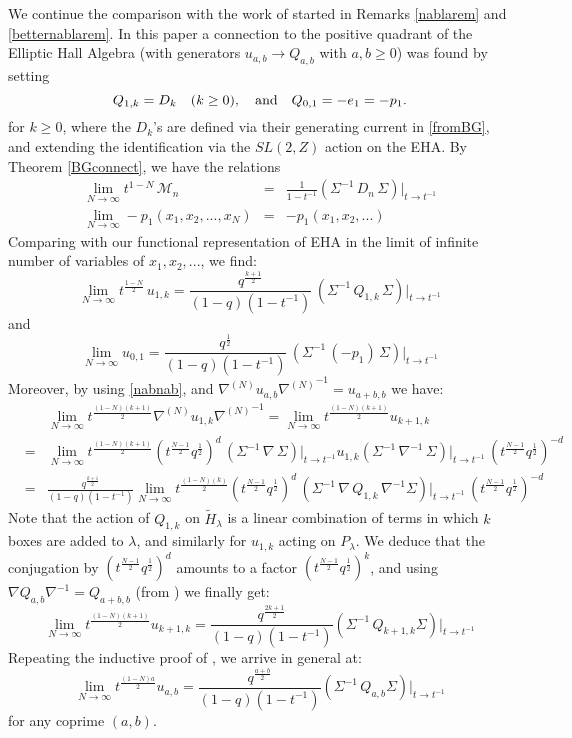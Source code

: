 \begin{remark}
We continue the comparison with the work of \cite{BGLX} started in Remarks \ref{nablarem} and
\ref{betternablarem}. In this paper a connection to the positive quadrant of the Elliptic Hall Algebra
(with generators $u_{a,b}\to Q_{a,b}$ with $a,b\geq 0$) was found by setting
$$Q_{1,k}= D_k \quad (k\geq 0), \quad {\rm and} \quad Q_{0,1}=-e_1=-p_1 .$$
for $k\geq 0$,
where the $D_k$'s are defined via their generating current in \eqref{fromBG}, and extending the identification
via the $SL(2,Z)$ action on the EHA. 
By Theorem \ref{BGconnect}, we have the relations
\begin{eqnarray*}
\lim_{N\to \infty} t^{1-N}\, {\mathcal M}_{n}&=& \frac{1}{1-t^{-1}}(\Sigma^{-1}\, D_n\, \Sigma)\vert_{t\to t^{-1}} \\
\lim_{N\to \infty} -p_1(x_1,x_2,...,x_N) &=&-p_1(x_1,x_2,...)
\end{eqnarray*}
Comparing with our functional representation of EHA in the limit of infinite number of variables of $x_1,x_2,...$, we find:
$$ \lim_{N\to \infty} t^{\frac{1-N}{2}}\, u_{1,k}=
\frac{q^{\frac{k+1}{2}}}{(1-q)(1-t^{-1})}\,(\Sigma^{-1}\, Q_{1,k}\, \Sigma)\vert_{t\to t^{-1}}$$
and
$$\lim_{N\to \infty} u_{0,1}=\frac{q^{\frac{1}{2}}}{(1-q)(1-t^{-1})}\, (\Sigma^{-1}\, (-p_1)\, \Sigma)\vert_{t\to t^{-1}}$$
Moreover, by using \eqref{nabnab}, and $\nabla^{(N)}u_{a,b}{\nabla^{(N)}}^{-1}=u_{a+b,b}$ we have:
\begin{eqnarray*}
&&\!\!\!\!\!\!\!\!\!\!\!\! \lim_{N\to \infty} t^{\frac{(1-N)(k+1)}{2}} \nabla^{(N)}u_{1,k}{\nabla^{(N)}}^{-1}=
\lim_{N\to \infty} t^{\frac{(1-N)(k+1)}{2}} u_{k+1,k}\\
&=&\lim_{N\to \infty}  t^{\frac{(1-N)(k+1)}{2}}(t^{\frac{N-1}{2}}q^{\frac{1}{2}})^{d}\, (\Sigma^{-1}\, \nabla\, \Sigma)\vert_{t\to t^{-1}} u_{1,k} (\Sigma^{-1}\, \nabla^{-1}\, \Sigma)\vert_{t\to t^{-1}}\,(t^{\frac{N-1}{2}}q^{\frac{1}{2}})^{-d}\\
&=&\frac{q^{\frac{k+1}{2}}}{(1-q)(1-t^{-1})}\lim_{N\to \infty} t^{\frac{(1-N)(k)}{2}} (t^{\frac{N-1}{2}}q^{\frac{1}{2}})^{d}\, (\Sigma^{-1}\, \nabla\, Q_{1,k}\, \nabla^{-1} \Sigma)\vert_{t\to t^{-1}} 
\,(t^{\frac{N-1}{2}}q^{\frac{1}{2}})^{-d}
\end{eqnarray*}
Note that the action of $Q_{1,k}$ on ${\tilde H}_\lambda$ is a linear combination of terms in which $k$ boxes are added
to $\lambda$, and similarly for $u_{1,k}$  acting on $P_\lambda$. We deduce that the conjugation
by $(t^{\frac{N-1}{2}}q^{\frac{1}{2}})^{d}$ amounts to a factor $(t^{\frac{N-1}{2}}q^{\frac{1}{2}})^{k}$, and using
$\nabla Q_{a,b}\nabla^{-1}=Q_{a+b,b}$ (from \cite{BGLX}) we finally get:
$$\lim_{N\to \infty} t^{\frac{(1-N)(k+1)}{2}}u_{k+1,k}=\frac{q^{\frac{2k+1}{2}}}{(1-q)(1-t^{-1})}
(\Sigma^{-1}\, Q_{k+1,k} \Sigma)\vert_{t\to t^{-1}} 
$$
Repeating the inductive proof of \cite{BGLX}, we arrive in general at:
$$ \lim_{N\to \infty} t^{\frac{(1-N)a}{2}}u_{a,b}=\frac{q^{\frac{a+b}{2}}}{(1-q)(1-t^{-1})}
(\Sigma^{-1}\, Q_{a,b} \Sigma)\vert_{t\to t^{-1}} $$
for any coprime $(a,b)$.
\end{remark}

